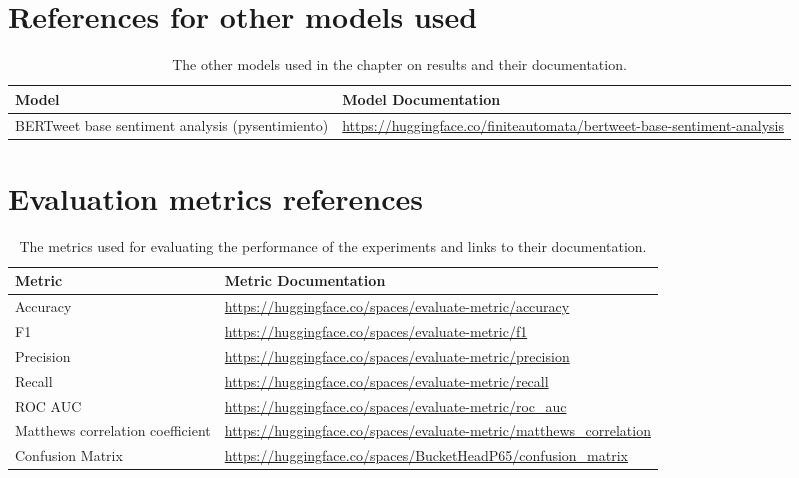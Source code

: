 \section{References for other models used}
\begin{table}[ht]
    \captionsetup{font=small}
    \centering
    \begin{tabularx}{\textwidth}{|l|X|}
        \hline
        \rowcolor[gray]{0.7}
        \textbf{Model}                                   & \textbf{Model Documentation}                                                         \\
        \hline
        BERTweet base sentiment analysis (pysentimiento) & \small{\url{https://huggingface.co/finiteautomata/bertweet-base-sentiment-analysis}} \\
        \hline
    \end{tabularx}
    \caption{The other models used in the chapter on results and their documentation.}
    \label{tab: apdxb_other_model_doc}
\end{table}

\section{Evaluation metrics references}

\begin{table}[ht]
    \captionsetup{font=small}
    \centering
    \begin{tabularx}{\textwidth}{|l|X|}
        \hline
        \rowcolor[gray]{0.7}
        \textbf{Metric}                  & \textbf{Metric Documentation}                                                    \\
        \hline

        Accuracy                         & \small{\url{https://huggingface.co/spaces/evaluate-metric/accuracy}}             \\
        \hline
        F1                               & \small{\url{https://huggingface.co/spaces/evaluate-metric/f1}}                   \\
        \hline
        Precision                        & \small{\url{https://huggingface.co/spaces/evaluate-metric/precision}}            \\
        \hline
        Recall                           & \small{\url{https://huggingface.co/spaces/evaluate-metric/recall}}               \\
        \hline
        ROC AUC                          & \small{\url{https://huggingface.co/spaces/evaluate-metric/roc_auc}}              \\
        \hline
        Matthews correlation coefficient & \small{\url{https://huggingface.co/spaces/evaluate-metric/matthews_correlation}} \\
        \hline
        Confusion Matrix                 & \small{\url{https://huggingface.co/spaces/BucketHeadP65/confusion_matrix}}       \\
        \hline
    \end{tabularx}
    \caption{The metrics used for evaluating the performance of the experiments and links to their documentation.}
    \label{tab: apdxb_metric_doc}
\end{table}

